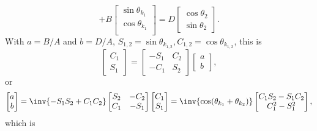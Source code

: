 \begin{enumerate}[(i)]
\begin{dmath}
+
B
\begin{bmatrix}
\sin\theta_{k_1} \\
\cos\theta_{k_1} \\
\end{bmatrix}
=
D
\begin{bmatrix}
\cos \theta_2 \\
\sin \theta_2
\end{bmatrix}.
\end{dmath}
%
With \( a = B/A \) and \( b = D/A \), \( S_{1,2} = \sin\theta_{k_{1,2}}, C_{1,2} = \cos\theta_{k_{1,2}} \), this is
%
\begin{dmath}\label{eqn:gradQuantumProblemSet4Problem3:800}
\begin{bmatrix}
C_1 \\
S_1
\end{bmatrix}
=
\begin{bmatrix}
- S_1 & C_2 \\
- C_1 & S_2
\end{bmatrix}
\begin{bmatrix}
a \\
b
\end{bmatrix},
\end{dmath}
%
or
\begin{dmath}\label{eqn:gradQuantumProblemSet4Problem3:820}
\begin{bmatrix}
a \\
b
\end{bmatrix}
=
\inv{- S_1 S_2 + C_1 C_2 }
\begin{bmatrix}
S_2 & -C_2 \\
C_1 & -S_1
\end{bmatrix}
\begin{bmatrix}
C_1 \\
S_1
\end{bmatrix}
=
\inv{\cos(\theta_{k_1} + \theta_{k_2})}
\begin{bmatrix}
C_1 S_2 - S_1 C_2 \\
C_1^2 - S_1^2
\end{bmatrix},
\end{dmath}
%
which is


\end{enumerate}
